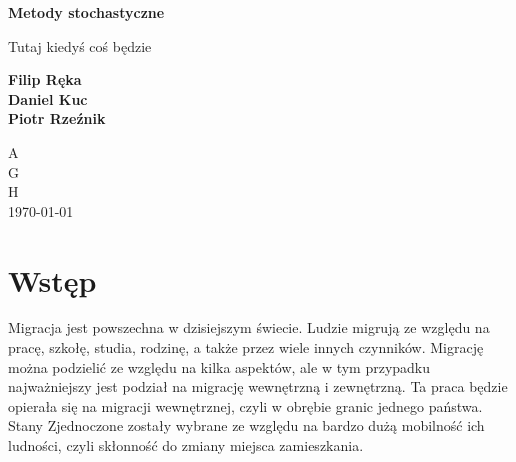 \documentclass[a4paper,12pt]{article}
\begin{document}
\begin{titlepage}
    \begin{center}
        \vspace*{1cm}

        \Huge
        \textbf{Metody stochastyczne}

        \vspace{0.5cm}
        \LARGE
        Tutaj kiedyś coś będzie

        \vspace{1.5cm}

        \textbf{Filip Ręka\\ Daniel Kuc\\ Piotr Rzeźnik}

        \vfill


        \vspace{0.8cm}

        \Large
        A\\
        G\\
        H\\
        \today

    \end{center}
\end{titlepage}
\newpage
\section*{Wstęp}
Migracja jest powszechna w dzisiejszym świecie. Ludzie migrują ze względu na pracę, szkołę,
studia, rodzinę, a także przez wiele innych czynników. Migrację można podzielić ze względu na
kilka aspektów, ale w tym przypadku najważniejszy jest podział na migrację wewnętrzną i zewnętrzną.
Ta praca będzie opierała się na migracji wewnętrznej, czyli w obrębie granic jednego państwa.
Stany Zjednoczone zostały wybrane ze względu na bardzo dużą mobilność ich ludności,
czyli skłonność do zmiany miejsca zamieszkania.
\end{document}
